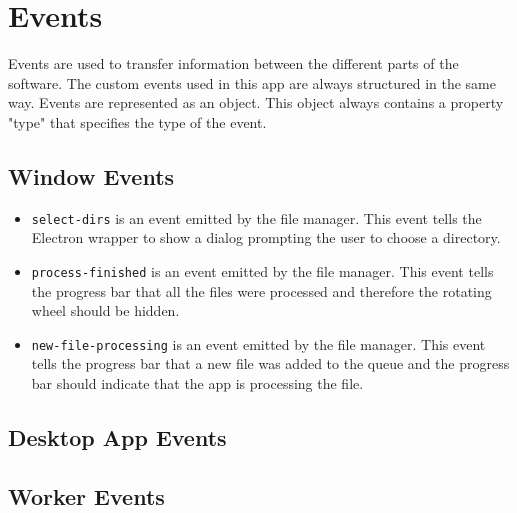 
\section{Events}
Events are used to transfer information between the different parts of the software.
The custom events used in this app are always structured in the same way. Events are represented as an object. This object always contains a property "type" that specifies the type of the event. 
\subsection{Window Events}
\begin{itemize}
    \item \texttt{select-dirs} is an event emitted by the file manager. This event tells the Electron wrapper to show a dialog prompting the user to choose a directory.
    \item \texttt{process-finished} is an event emitted by the file manager. This event tells the progress bar that all the files were processed and therefore the rotating wheel should be hidden.
    \item \texttt{new-file-processing} is an event emitted by the file manager. This event tells the progress bar that a new file was added to the queue and the progress bar should indicate that the app is processing the file.
\end{itemize}
\subsection{Desktop App Events}
\subsection{Worker Events}